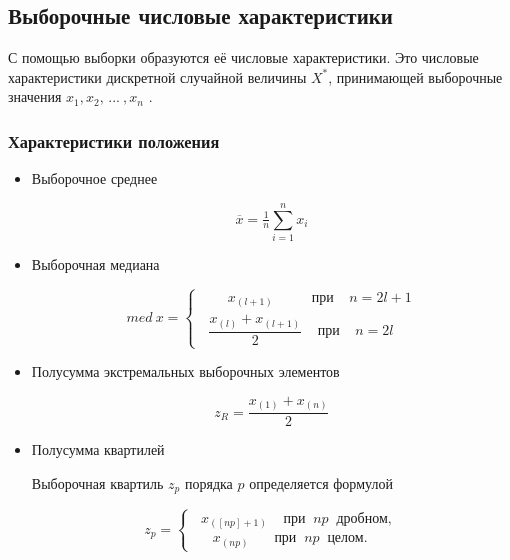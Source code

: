\documentclass[report.tex]{subfiles}
\begin{document}
\subsection{Выборочные числовые характеристики}

С помощью выборки образуются её числовые характеристики. Это числовые характеристики дискретной случайной величины $X^*$, принимающей выборочные значения $x_1, x_2, \, ... \: , x_n$ \cite[с. 411]{b:probSectMath}.

\subsubsection{Характеристики положения}

\begin{itemize}
  \item Выборочное среднее
  
  \begin{equation} \label{eq:mean}
    \overline{x} = \tfrac{1}{n}\sum\limits_{i=1}^n x_i
  \end{equation}
  
  \item Выборочная медиана
  
  \begin{equation} \label{eq:med}
    med \: x = 
    \begin{cases} 
        \;\;\;\;\;\;\; x_{(l+1)} \:\;\;\;\;\;\;\;\;\; \text{при} \;\;\;\; n = 2l + 1\\
        \;\; \dfrac{x_{(l)} + x_{(l+1)}}{2} \;\;\;\; \text{при} \;\;\;\; n = 2l
    \end{cases}
  \end{equation}
  
  \item Полусумма экстремальных выборочных элементов
  
  \begin{equation} \label{eq:zR}
    z_R = \dfrac{x_{(1)} + x_{(n)}}{2}
  \end{equation}
  
  \item Полусумма квартилей
  
  Выборочная квартиль $z_p$ порядка $p$ определяется формулой
  
   \begin{equation}
    z_p =
    \begin{cases}
        \;\; x_{([np]+1)} \;\;\;\; \text{при} \;\; np \;\; \text{дробном},\\
        \;\;\;\;\; x_{(np)} \,\:\;\;\;\;\; \text{при} \;\; np \;\; \text{целом}.
    \end{cases}
  \end{equation}
  

\end{itemize}
\end{document}
